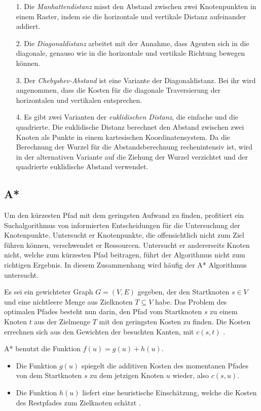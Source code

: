 \begin{itemize}
\item[1.] Die \textit{Manhattendistanz} misst den Abstand zwischen zwei Knotenpunkten in einem Raster, indem sie die horizontale und vertikale Distanz aufeinander addiert.

\item[2.] Die \textit{Diagonaldistanz} arbeitet mit der Annahme, dass Agenten sich in die diagonale, genauso wie in die horizontale und vertikale Richtung bewegen können.

\item[3.] Der \textit{Chebyshev-Abstand} ist eine Variante der Diagonaldistanz. Bei ihr wird angenommen, dass die Kosten für die diagonale Traversierung der horizontalen und vertikalen entsprechen.

\item[4.] Es gibt zwei Varianten der \textit{euklidischen Distanz}, die einfache und die quadrierte. Die euklidische Distanz berechnet den Abstand zwischen zwei Knoten als Punkte in einem kartesischen Koordinatensystem. Da die Berechnung der Wurzel für die Abstandsberechnung rechenintensiv ist, wird in der alternativen Variante auf die Ziehung der Wurzel verzichtet und der quadrierte euklidische Abstand verwendet\cite{You19}.

\end{itemize}
\subsection{A*}
\label{sec:astar}
Um den kürzesten Pfad mit dem geringsten Aufwand zu finden, profitiert ein Suchalgorithmus von informierten Entscheidungen für die Untersuchung der Knotenpunkte. Untersucht er Knotenpunkte, die offensichtlich nicht zum Ziel führen können, verschwendet er Ressourcen. Untersucht er andererseits Knoten nicht, welche zum kürzesten Pfad beitragen, führt der Algorithmus nicht zum richtigen Ergebnis. In diesem Zusammenhang wird häufig der A* Algorithmus untersucht.

Es sei ein gewichteter Graph  $G = (V, E)$ gegeben, der den Startknoten $s \in V$ und eine nichtleere Menge aus Zielknoten $T \subseteq V$ habe. Das Problem des optimalen Pfades besteht nun darin, den Pfad vom Startknoten $s$ zu einem Knoten $t$ aus der Zielmenge $T$ mit den geringsten Kosten zu finden.
Die Kosten errechnen sich aus den Gewichten der besuchten Kanten, mit $c(s,t)$ \cite{RinaDechterandJudeaPearl.1983}.

A* benutzt die Funktion $f(u) = g(u) + h(u)$.
\begin{itemize}
\item Die Funktion $g(u)$ spiegelt die additiven Kosten des momentanen Pfades von dem Startknoten $s$ zu dem jetzigen Knoten $u$ wieder, also $c(s,u)$.
\item Die Funktion $h(u)$ liefert eine heuristische Einschätzung, welche die Kosten des Restpfades zum Zielknoten schätzt \cite{RinaDechterandJudeaPearl.1983}.
\end{itemize}


